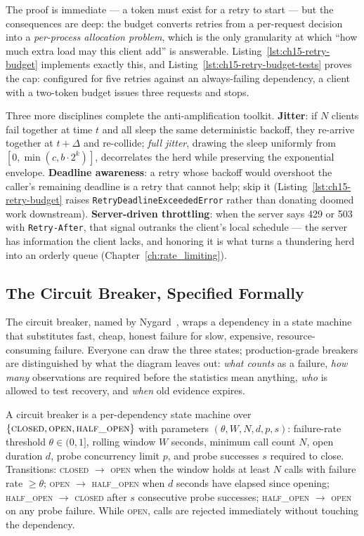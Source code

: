 The proof is immediate --- a token must exist for a retry to start --- but
the consequences are deep: the budget converts retries from a per-request
decision into a \emph{per-process allocation problem}, which is the only
granularity at which ``how much extra load may this client add'' is
answerable. Listing~\ref{lst:ch15-retry-budget} implements exactly this,
and Listing~\ref{lst:ch15-retry-budget-tests} proves the cap: configured
for five retries against an always-failing dependency, a client with a
two-token budget issues three requests and stops.

Three more disciplines complete the anti-amplification toolkit.
\textbf{Jitter}: if $N$ clients fail together at time $t$ and all sleep the
same deterministic backoff, they re-arrive together at $t + \Delta$ and
re-collide; \emph{full jitter}, drawing the sleep uniformly from
$[0, \min(c, b \cdot 2^{k})]$, decorrelates the herd while preserving the
exponential envelope. \textbf{Deadline awareness}: a retry whose backoff
would overshoot the caller's remaining deadline is a retry that cannot
help; skip it (Listing~\ref{lst:ch15-retry-budget} raises
\texttt{RetryDeadlineExceededError} rather than donating doomed work
downstream). \textbf{Server-driven throttling}: when the server says 429 or
503 with \texttt{Retry-After}, that signal outranks the client's local
schedule --- the server has information the client lacks, and honoring it
is what turns a thundering herd into an orderly queue
(Chapter~\ref{ch:rate_limiting}).

\subsection{The Circuit Breaker, Specified Formally}
\label{subsec:ch15-breaker}

The circuit breaker, named by Nygard~\cite{nygard2018releaseit}, wraps a
dependency in a state machine that substitutes fast, cheap, honest failure
for slow, expensive, resource-consuming failure. Everyone can draw the
three states; production-grade breakers are distinguished by what the
diagram leaves out: \emph{what counts} as a failure, \emph{how many}
observations are required before the statistics mean anything, \emph{who}
is allowed to test recovery, and \emph{when} old evidence expires.

\begin{definition}
\label{def:ch15-breaker}
A circuit breaker is a per-dependency state machine over
$\{\textsc{closed}, \textsc{open}, \textsc{half\_open}\}$ with parameters
$(\theta, W, N, d, p, s)$: failure-rate threshold $\theta \in (0,1]$,
rolling window $W$ seconds, minimum call count $N$, open duration $d$,
probe concurrency limit $p$, and probe successes $s$ required to close.
Transitions: \textsc{closed} $\to$ \textsc{open} when the window holds at
least $N$ calls with failure rate $\ge \theta$; \textsc{open} $\to$
\textsc{half\_open} when $d$ seconds have elapsed since opening;
\textsc{half\_open} $\to$ \textsc{closed} after $s$ consecutive probe
successes; \textsc{half\_open} $\to$ \textsc{open} on any probe failure.
While \textsc{open}, calls are rejected immediately without touching the
dependency.
\end{definition}

